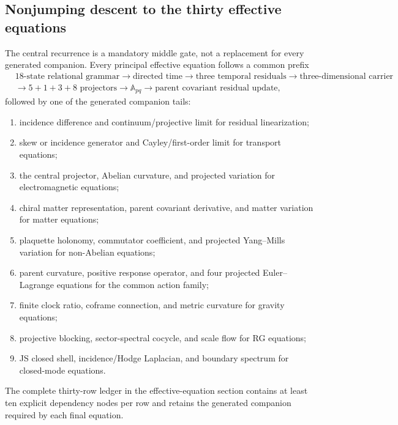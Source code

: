 \documentclass[11pt]{article}
\numberwithin{equation}{section}
\theoremstyle{remark}
\begin{document}
\subsection{Nonjumping descent to the thirty effective equations}
The central recurrence is a mandatory middle gate, not a replacement for every generated companion.  Every principal effective equation follows a common prefix
\begin{equation}
\begin{split}
&18\text{-state relational grammar}
\to\text{directed time}
\to\text{three temporal residuals}
\to\text{three-dimensional carrier}\\
&\to 5+1+3+8\text{ projectors}
\to\mathbb A_{pq}
\to\text{parent covariant residual update},
\end{split}
\label{eq:commonnojumprefix}
\end{equation}
followed by one of the generated companion tails:
\begin{enumerate}
\item incidence difference and continuum/projective limit for residual linearization;
\item skew or incidence generator and Cayley/first-order limit for transport equations;
\item the central projector, Abelian curvature, and projected variation for electromagnetic equations;
\item chiral matter representation, parent covariant derivative, and matter variation for matter equations;
\item plaquette holonomy, commutator coefficient, and projected Yang--Mills variation for non-Abelian equations;
\item parent curvature, positive response operator, and four projected Euler--Lagrange equations for the common action family;
\item finite clock ratio, coframe connection, and metric curvature for gravity equations;
\item projective blocking, sector-spectral cocycle, and scale flow for RG equations;
\item JS closed shell, incidence/Hodge Laplacian, and boundary spectrum for closed-mode equations.
\end{enumerate}
The complete thirty-row ledger in the effective-equation section contains at least ten explicit dependency nodes per row and retains the generated companion required by each final equation.
\end{document}
